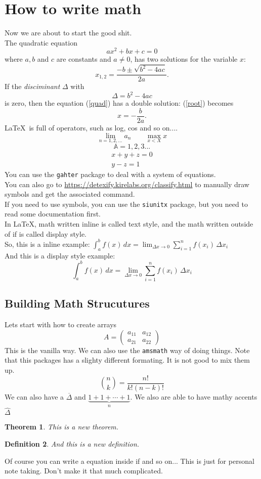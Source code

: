 \documentclass[a4paper, 12pt]{book}
\newcommand{\im}[1]{{\(#1\)}}
\newcommand{\cm}[1]{{\[#1\]}} %
\newtheorem{thm}{Theorem}
\newtheorem{dfn}[thm]{Definition}
\begin{document}
\section{How to write math}
Now we are about to start the good shit.\\
The quadratic equation
\begin{equation}
    \label{quad}
    ax^2 + bx + c = 0
\end{equation}
where \im{a, b} and \im{c} are constants and \im{ a \neq 0}, has two solutions for the variable \im{x}:
\begin{equation}
    \label{root}
    x_{1, 2} = \frac{-b \pm \sqrt{b^2-4ac}}{2a}.
\end{equation}
If the \emph{disciminant} \im{\Delta} with \cm{\Delta = b^2 - 4ac} is zero, then the equation (\ref{quad}) has a double solution:
(\ref{root}) becomes \cm{x = - \frac{b}{2a}.}
\LaTeX\ is full of operators, such as log, cos and so on....
\cm{\lim_{n=1, 2, \ldots} a_n \qquad \max_{x<X} x }
\cm{\mathbb{A} = 1, 2, 3...}
\begin{gather}
    x + y + z = 0\\
    y - z = 1
\end{gather}
You can use the \texttt{gahter} package to deal with a system of equations.\\
You can also go to \url{https://detexify.kirelabs.org/classify.html} to manually draw symbols and get the associated command.\\
If you need to use symbols, you can use the \texttt{siunitx} package, but you need to read some documentation first.\\
In \LaTeX, math written inline is called text style, and the math written outside of if is called display style.\\
So, this is a inline example:
\im{
\int_a^b \! f(x) \, dx = \lim_{\Delta x \rightarrow 0}
\sum_{i=1}^{n} f(x_i) \,\Delta x_i
}\\
And this is a display style example:
\cm{
\int_a^b \! f(x) \, dx = \lim_{\Delta x \rightarrow 0}
\sum_{i=1}^{n} f(x_i) \,\Delta x_i
}
\subsection{Building Math Strucutures}
Lets start with how to create arrays
\cm{
    A = \left(
        \begin{array}{cc}
            a_{11} & a_{12} \\
            a_{21} & a_{22}
        \end{array}
        \right)
}
This is the vanilla way. We can also use the \texttt{amsmath} way of doing things. Note that this packages has a slighty different formating. It is not good to mix them up.
\cm{
    \binom{n}{k} = \frac{n!}{k!(n-k)!}
}
We can also have a \im{\overline{\Delta}} and \im{\underbrace{1 + 1 + \cdots + 1}_n}.
We also are able to have mathy accents \im{\widehat{\Delta}}
\begin{thm}
    This is a new theorem.
\end{thm}
\begin{dfn}
    And this is a new definition.
\end{dfn}
Of course you can write a equation inside if and so on... This is just for personal note taking. Don't make it that much complicated.
\end{document}
